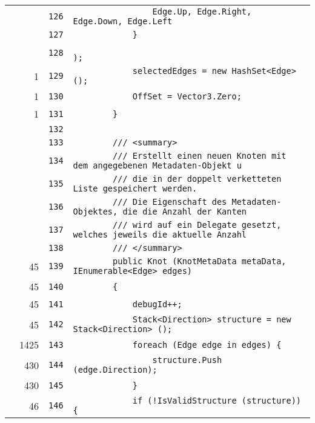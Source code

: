 \documentclass[a4paper,10pt]{article}
\begin{document}
\begin{longtable}[l]{lrrl}
\cellcolor{gray} &  & \verb~126~ & \verb~                Edge.Up, Edge.Right, Edge.Down, Edge.Left~\\
\cellcolor{gray} &  & \verb~127~ & \verb~            }~\\
\cellcolor{gray} &  & \verb~128~ & \verb~                                                 );~\\
\cellcolor{green} & 1 & \verb~129~ & \verb~            selectedEdges = new HashSet<Edge> ();~\\
\cellcolor{green} & 1 & \verb~130~ & \verb~            OffSet = Vector3.Zero;~\\
\cellcolor{green} & 1 & \verb~131~ & \verb~        }~\\
\cellcolor{gray} &  & \verb~132~ & \verb~~\\
\cellcolor{gray} &  & \verb~133~ & \verb~        /// <summary>~\\
\cellcolor{gray} &  & \verb~134~ & \verb~        /// Erstellt einen neuen Knoten mit dem angegebenen Metadaten-Objekt u~\\
\cellcolor{gray} &  & \verb~135~ & \verb~        /// die in der doppelt verketteten Liste gespeichert werden.~\\
\cellcolor{gray} &  & \verb~136~ & \verb~        /// Die Eigenschaft des Metadaten-Objektes, die die Anzahl der Kanten ~\\
\cellcolor{gray} &  & \verb~137~ & \verb~        /// wird auf ein Delegate gesetzt, welches jeweils die aktuelle Anzahl~\\
\cellcolor{gray} &  & \verb~138~ & \verb~        /// </summary>~\\
\cellcolor{green} & 45 & \verb~139~ & \verb~        public Knot (KnotMetaData metaData, IEnumerable<Edge> edges)~\\
\cellcolor{green} & 45 & \verb~140~ & \verb~        {~\\
\cellcolor{green} & 45 & \verb~141~ & \verb~            debugId++;~\\
\cellcolor{green} & 45 & \verb~142~ & \verb~            Stack<Direction> structure = new Stack<Direction> ();~\\
\cellcolor{green} & 1425 & \verb~143~ & \verb~            foreach (Edge edge in edges) {~\\
\cellcolor{green} & 430 & \verb~144~ & \verb~                structure.Push (edge.Direction);~\\
\cellcolor{green} & 430 & \verb~145~ & \verb~            }~\\
\cellcolor{green} & 46 & \verb~146~ & \verb~            if (!IsValidStructure (structure)) {~\\

\end{longtable}
\end{document}
